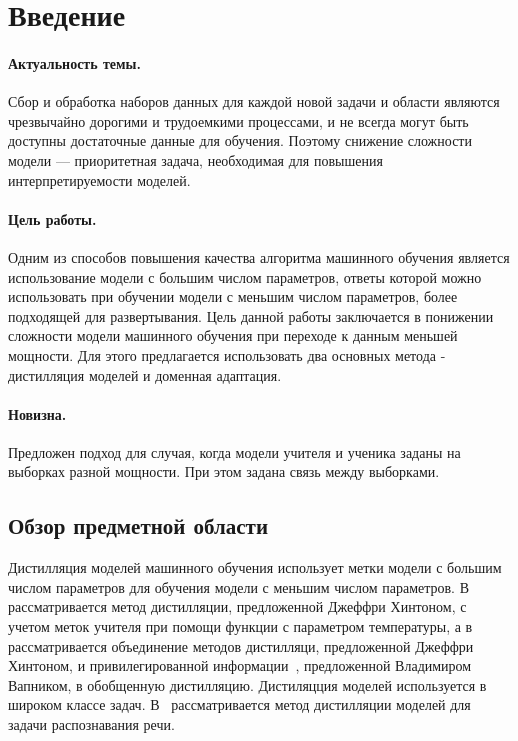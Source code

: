 \newpage


\section{Введение}

\paragraph{Актуальность темы.} Сбор и обработка наборов данных для каждой новой задачи и области являются чрезвычайно дорогими и трудоемкими процессами, и не всегда могут быть доступны достаточные данные для обучения. Поэтому снижение сложности модели --- приоритетная задача, необходимая для повышения интерпретируемости моделей.

\paragraph{Цель работы.} Одним из способов повышения качества алгоритма машинного обучения является использование модели с большим числом параметров, ответы которой можно использовать при обучении модели с меньшим числом параметров, более подходящей для развертывания. Цель данной работы заключается в понижении сложности модели машинного обучения при переходе к данным меньшей мощности. Для этого предлагается использовать два основных метода - дистилляция моделей и доменная адаптация.

\paragraph{Новизна.} Предложен подход для случая, когда модели учителя и ученика заданы на выборках разной мощности. При этом задана связь между выборками.

\subsection{Обзор предметной области}

Дистилляция моделей машинного обучения использует метки модели с большим числом параметров для обучения модели с меньшим числом параметров. В~\cite{Hinton2015} рассматривается метод дистилляции, предложенной Джеффри Хинтоном, с учетом меток учителя при помощи функции  с параметром температуры, а в~\cite{Vapnik2016} рассматривается объединение методов дистилляци, предложенной Джеффри Хинтоном, и привилегированной информации~\cite{Vapnik2016}, предложенной Владимиром Вапником, в обобщенную дистилляцию. Дистиляцция моделей используется в широком классе задач. В~\cite{MDASR} рассматривается метод дистилляции моделей для задачи распознавания речи.

